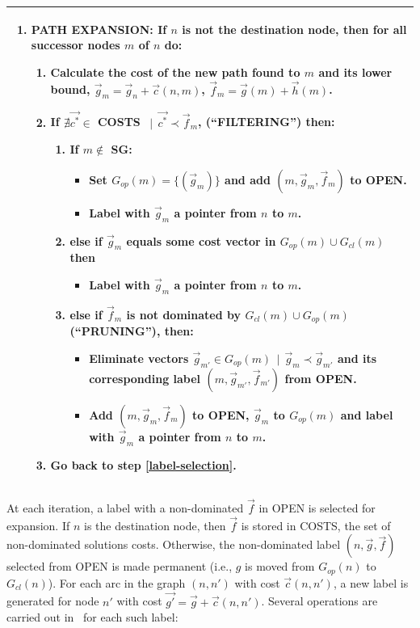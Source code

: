 \begin{table}
{\begin{tabular}{p{\columnwidth}}
\begin{enumerate}
\item PATH EXPANSION: If $n$ is not the destination node, then for all successor nodes $m$ of $n$ do:
  \begin{enumerate}
    \item Calculate the cost of the new path found to $m$ and its
     lower bound, $\vec g_m = \vec g_n + \vec c(n,m)$,  $\vec f_m = \vec g(m) + \vec h(m)$.
    \item If $\nexists \vec{c^*} \in$ COSTS $\ \ | \ \ \vec{c^*} \prec \vec f_m$, (``FILTERING'') then: \label{chapMultiObjAlg:alg:filteringNamoa}
      \begin{enumerate}
      \item If $m \notin$ SG: 
	\begin{itemize}
	\item Set $G_{op}(m)= \{(\vec g_m)\}$ and add $(m, \vec g_m, \vec f_m)$ to OPEN.
	\item Label with $\vec g_m$ a pointer from $n$ to $m$.
	\end{itemize}
      \item else if $\vec g_m$ equals some cost vector in  $G_{op}(m) \cup G_{cl}(m)$ then
	\begin{itemize}
	\item Label with $\vec g_m$ a pointer from $n$ to $m$.
	\end{itemize}
      \item  else if $\vec f_m$ is not dominated by $G_{cl}(m) \cup G_{op}(m)$ (``PRUNING''), then:  
	\begin{itemize}
   \item Eliminate vectors $\vec g_{m'} \in G_{op}(m) \ \ |
          \ \ \vec g_m \prec \vec g_{m'}$ and its corresponding label $(m, \vec g_{m'}, \vec f_{m'})$ from OPEN.
	\item Add $(m, \vec g_m, \vec f_m)$ to OPEN,
          $\vec g_m$ to $G_{op}(m)$ and label with $\vec g_m$ a
          pointer from $n$ to $m$.
	\end{itemize}
      \end{enumerate}
    \item Go back to step \ref{label-selection}.
  \end{enumerate}
\end{enumerate}
\\ \hline
\end{tabular}
}
\label{ChapMultiObjAlg:tab:pseudocode-namoa} 
\end{table}

At each iteration, a label with a non-dominated $\vec f$ in OPEN is selected for expansion. If $n$ is the destination node, then $\vec f$ is stored in COSTS, the set of non-dominated solutions costs. Otherwise, the non-dominated label $(n, \vec g,  \vec f)$ selected from OPEN is made permanent (i.e., $ g$ is moved from $G_{op}(n)$ to $G_{cl}(n)$). For each arc in the graph $(n, n')$ with cost $ \vec c(n, n')$, a new label is generated for node $n'$ with cost $\vec{g'} = \vec  g + \vec  c(n, n')$. Several operations are carried out in \namoa \ for each such label:

